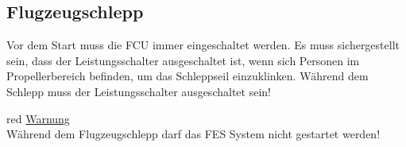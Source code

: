 \subsection{Flugzeugschlepp}
Vor dem Start muss die FCU immer eingeschaltet werden. Es muss sichergestellt sein, dass der Leistungsschalter ausgeschaltet ist, wenn sich Personen im Propellerbereich befinden, um das Schleppseil einzuklinken. Während dem Schlepp muss der Leistungsschalter ausgeschaltet sein!\\

\begin{color}{red}
\large{\underline{Warnung}}\\
Während dem Flugzeugschlepp darf das FES System nicht
gestartet werden!
\end{color}\\

